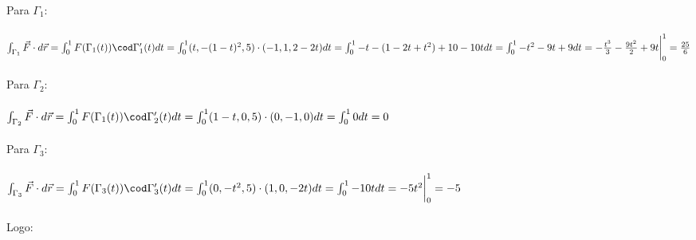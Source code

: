 \documentclass[11pt,a4paper]{article}
\begin{document}
\begin{enumerate}
{		               Para $\Gamma_{1}$: \\\\
		               $\int_{\Gamma_{1}} \vec{F} \cdot d\vec{r} = \int_{0}^{1} F(\Gamma_{1}(t)) \cod \Gamma_{1}'(t) dt\\\\
		               =\int_{0}^{1} (t,-(1-t)^2,5) \cdot (-1,1,2-2t)dt\\\\
		               =\int_{0}^{1} -t-(1-2t+t^2)+10-10t dt\\\\
		               =\int_{0}^{1} -t^2-9t+9 dt \\\\
		               =-\frac{t^3}{3}-\frac{9t^2}{2}+9t \bigg|_0^1 \\\\
		               =\frac{25}{6}$\\\\
		               Para $\Gamma_{2}$: \\\\
		               $\int_{\Gamma_{2}} \vec{F} \cdot d\vec{r} = \int_{0}^{1} F(\Gamma_{1}(t)) \cod \Gamma_{2}'(t) dt\\\\
		               =\int_{0}^{1} (1-t,0,5) \cdot (0,-1,0)dt\\\\
		               =\int_{0}^{1} 0 dt\\\\
		               =0$\\\\
		               Para $\Gamma_{3}$: \\\\
		               $\int_{\Gamma_{3}} \vec{F} \cdot d\vec{r} = \int_{0}^{1} F(\Gamma_{3}(t)) \cod \Gamma_{3}'(t) dt\\\\
		               =\int_{0}^{1} (0,-t^2,5) \cdot (1,0,-2t)dt\\\\
		               =\int_{0}^{1} -10t dt\\\\
		               =-5t^2 \bigg|_0^1 \\\\
		               =-5$\\\\
                      Logo:\\\\
}
\end{enumerate}
\end{document}
